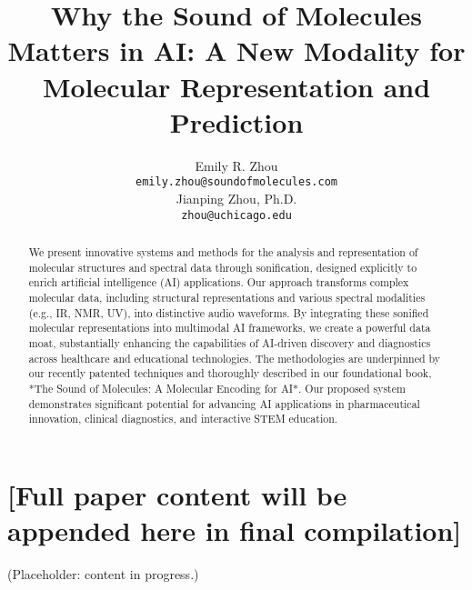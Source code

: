 \documentclass[11pt]{article}
\title{Why the Sound of Molecules Matters in AI: A New Modality for Molecular Representation and Prediction}
\author{Emily R. Zhou \\ \texttt{emily.zhou@soundofmolecules.com} \\ Jianping Zhou, Ph.D. \\ \texttt{zhou@uchicago.edu}}
\date{}
\begin{document}
\maketitle

\begin{abstract}
We present innovative systems and methods for the analysis and representation of molecular structures and spectral data through sonification, designed explicitly to enrich artificial intelligence (AI) applications. Our approach transforms complex molecular data, including structural representations and various spectral modalities (e.g., IR, NMR, UV), into distinctive audio waveforms. By integrating these sonified molecular representations into multimodal AI frameworks, we create a powerful data moat, substantially enhancing the capabilities of AI-driven discovery and diagnostics across healthcare and educational technologies. The methodologies are underpinned by our recently patented techniques and thoroughly described in our foundational book, *The Sound of Molecules: A Molecular Encoding for AI*. Our proposed system demonstrates significant potential for advancing AI applications in pharmaceutical innovation, clinical diagnostics, and interactive STEM education.
\end{abstract}

\section*{[Full paper content will be appended here in final compilation]}
(Placeholder: content in progress.)
\end{document}
